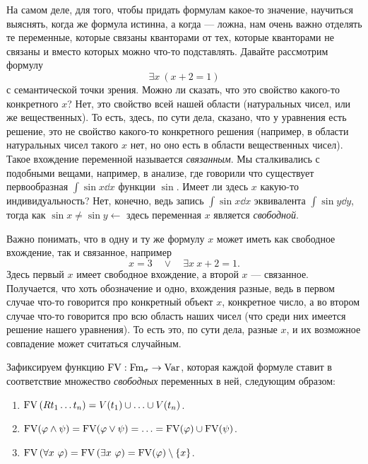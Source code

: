 На самом деле, для того, чтобы придать формулам какое-то значение, научиться выяснять, когда же формула истинна, а когда --- ложна, нам очень важно отделять те переменные, которые связаны кванторами от тех, которые кванторами не связаны и вместо которых можно что-то подставлять.
Давайте рассмотрим формулу
$$
    \exists x~(x + 2 = 1)
$$
с семантической точки зрения.
Можно ли сказать, что это свойство какого-то конкретного $x$?
Нет, это свойство всей нашей области (натуральных чисел, или же вещественных).
То есть, здесь, по сути дела, сказано, что у уравнения есть решение,
это не свойство какого-то конкретного решения (например, в области натуральных чисел такого $x$ нет, но оно есть в области вещественных чисел).
Такое вхождение переменной называется {\it связанным}.
Мы сталкивались с подобными вещами, например, в анализе, где говорили что существует первообразная $\int \sin x \dd x$ функции $\sin$.
Имеет ли здесь $x$ какую-то индивидуальность?
Нет, конечно, ведь запись $\int \sin x \dd x$ эквивалента $\int \sin y \dd y$, тогда как $\sin x \neq \sin y \leftarrow$ здесь переменная $x$ является {\it свободной}.

Важно понимать, что в одну и ту же формулу $x$ может иметь как свободное вхождение, так и связанное, например
$$
    x = 3 \quad \lor \quad \exists x~x + 2 = 1.
$$
Здесь первый $x$ имеет свободное вхождение, а второй $x$ --- связанное.
Получается, что хоть обозначение и одно, вхождения разные, ведь в первом случае что-то говорится про конкретный объект $x$, конкретное число, а во втором случае что-то говорится про всю область наших чисел (что среди них имеется решение нашего уравнения).
То есть это, по сути дела, разные $x$, и их возможное совпадение может считаться случайным.

\begin{definition}
    Зафиксируем функцию $\mathrm{FV}: \mathrm{Fm}_{\sigma} \to \mathrm{Var}$, которая каждой формуле ставит в соответствие множество {\it свободных} переменных в ней, следующим образом:
    \begin{enumerate}
        \item $\mathrm{FV}\left(R t_{1} \ldots t_{n}\right) = V(t_{1}) \cup \ldots \cup V(t_{n})$.
        \item $\mathrm{FV}(\varphi \land \psi) = \mathrm{FV}(\varphi \lor \psi) = \ldots = \mathrm{FV}(\varphi) \cup \mathrm{FV}(\psi)$.
        \item $\mathrm{FV}\left(\forall x~\varphi\right) = \mathrm{FV}\left(\exists x~\varphi\right) = \mathrm{FV}(\varphi) \setminus \{x\}$.
    \end{enumerate}
\end{definition}

